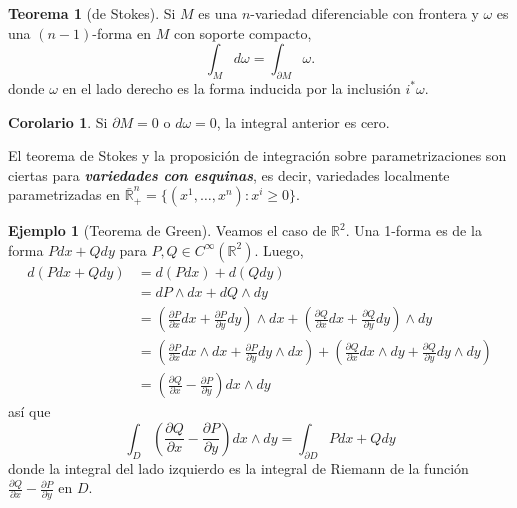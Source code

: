 \documentclass[spanish]{article}
\theoremstyle{definition}
\newtheorem*{teo}{Teorema}
\newtheorem*{coro}{Corolario}
\newtheorem*{ejem}{Ejemplo}
\newcommand{\R}{\mathbb{R}}
\newcommand{\Cinf}{C^\infty}
\begin{document}
	\begin{teo}[de Stokes]
		Si $M$ es una $n$-variedad diferenciable con frontera y $\omega$ es una $(n-1)$-forma en $M$ con soporte compacto,
		\[\int_{M}d\omega=\int_{\partial M}\omega.\]
		donde $\omega$ en el lado derecho es la forma inducida por la inclusión $i^*\omega$.
	\end{teo}
	\begin{coro}
		Si $\partial M=0$ o $d\omega=0$, la integral anterior es cero.
	\end{coro}

		El teorema de Stokes y la proposición de integración sobre parametrizaciones son ciertas para \textbf{\textit{variedades con esquinas}}, es decir, variedades localmente parametrizadas en $\bar{\R}^n_+=\{(x^1,\ldots,x^n):x^i\geq0\}$.

	\iffalse
	\begin{ejem}[Teorema de Green]
		Veamos el caso de $\R^2$. Una 1-forma es de la forma $Pdx+Qdy$ para $P,Q\in\Cinf(\R^2)$. Luego,
		\begin{align*}
			d(Pdx+Qdy)&=d(Pdx)+d(Qdy)\\
			&=dP\wedge dx+dQ\wedge dy\\
			&=\left(\frac{\partial P}{\partial x}dx+\frac{\partial P}{\partial y}dy\right)\wedge dx+\left(\frac{\partial Q}{\partial x}dx+\frac{\partial Q}{\partial y}dy\right)\wedge dy\\
			&=\left(\frac{\partial P}{\partial x}dx\wedge dx+\frac{\partial P}{\partial y}dy\wedge dx\right)+\left(\frac{\partial Q}{\partial x}dx\wedge dy+\frac{\partial Q}{\partial y}dy\wedge dy\right)\\
			&=\left(\frac{\partial Q}{\partial x}-\frac{\partial P}{\partial y}\right)dx\wedge dy
		\end{align*}
		así que
		\[\int_{D}\left(\frac{\partial Q}{\partial x}-\frac{\partial P}{\partial y}\right)dx\wedge dy=\int_{\partial D}Pdx+Qdy\]
		donde la integral del lado izquierdo es la integral de Riemann de la función $\frac{\partial Q}{\partial x}-\frac{\partial P}{\partial y}$ en $D$.
	\end{ejem}
\end{document}
